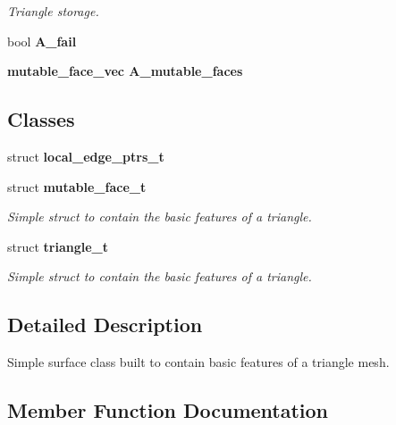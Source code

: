 \begin{CompactItemize}
\begin{CompactList}\small\item\em Triangle storage. \item\end{CompactList}\item 
bool \textbf{A\_\-fail}\label{classASCbase_1_1geometry_1_1SimpleTrimeshTwo_dcacbf7733d856f2a2a4d02e36cb6ce0}

\item 
\bf{mutable\_\-face\_\-vec} \textbf{A\_\-mutable\_\-faces}\label{classASCbase_1_1geometry_1_1SimpleTrimeshTwo_2b5adc945a54bbd3e91a89c5a56f51c1}

\end{CompactItemize}
\subsection*{Classes}
\begin{CompactItemize}
\item 
struct \textbf{local\_\-edge\_\-ptrs\_\-t}
\item 
struct \bf{mutable\_\-face\_\-t}
\begin{CompactList}\small\item\em Simple struct to contain the basic features of a triangle. \item\end{CompactList}\item 
struct \bf{triangle\_\-t}
\begin{CompactList}\small\item\em Simple struct to contain the basic features of a triangle. \item\end{CompactList}\end{CompactItemize}


\subsection{Detailed Description}
Simple surface class built to contain basic features of a triangle mesh. 



\subsection{Member Function Documentation}
